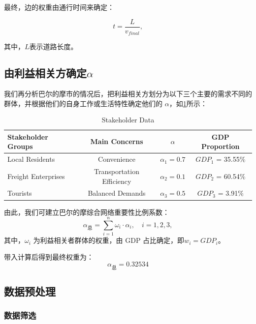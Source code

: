 \documentclass[12pt, a4paper, oneside]{ctexart}
\begin{document}
最终，边的权重由通行时间来确定：

\begin{equation}
t=\frac{L}{v_{final}},
\end{equation}

其中，\(L\)表示道路长度。

\subsection{由利益相关方确定\(\alpha\)}
\label{sec:alpha}

我们再分析巴尔的摩市的情况后，把利益相关方划分为以下三个主要的需求不同的群体，并根据他们的自身工作或生活特性确定他们的 \(\alpha\)，如\ref{tab:stakeholder_data}所示：

\begin{table}[H]
  \centering
  \caption{Stakeholder Data}
  \label{tab:stakeholder_data}
  \begin{tabular}{@{}lccc@{}}
    \toprule
    \textbf{Stakeholder Groups} & \textbf{Main Concerns} & \textbf{$\alpha$} & \textbf{GDP Proportion} \\
    \midrule
    Local Residents & Convenience & $\alpha_1 = 0.7$ & \(GDP_1\) = 35.55\% \cite{mdba} \\
    Freight Enterprises & Transportation Efficiency & $\alpha_2 = 0.1$ & \(GDP_2\) = 60.54\% \cite{gdpa}\\
    Tourists & Balanced Demands & $\alpha_3 = 0.5$ & \(GDP_3\) = 3.91\% \cite{aboutus} \\
    \bottomrule
  \end{tabular}
\end{table}

由此，我们可建立巴尔的摩综合网络重要性比例系数：
\begin{equation}
  \alpha_{\text{总}}=\sum_{i=1}^{n}\omega_i\cdot\alpha_i,\quad i=1,2,3,
\end{equation}
其中，\(\omega_i\) 为利益相关者群体的权重，由 GDP 占比确定，即\(w_i=GDP_i\)。

带入计算后得到最终权重为：
\begin{equation}
  \alpha_{\text{总}}=0.32534
\end{equation}

\subsection{数据预处理}

\subsubsection{数据筛选}
\end{document}
